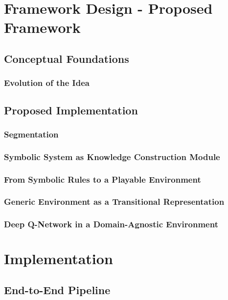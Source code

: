 \documentclass[12pt,a4paper]{report}
\begin{document}
\chapter{Framework Design - Proposed Framework}

\section{Conceptual Foundations}

\subsection{Evolution of the Idea}

\section{Proposed Implementation}

\subsection{Segmentation}

\subsection{Symbolic System as Knowledge Construction Module}

\subsection{From Symbolic Rules to a Playable Environment}

\subsection{Generic Environment as a Transitional Representation}

\subsection{Deep Q-Network in a Domain-Agnostic Environment}


\chapter{Implementation}

\section{End-to-End Pipeline}
\end{document}
